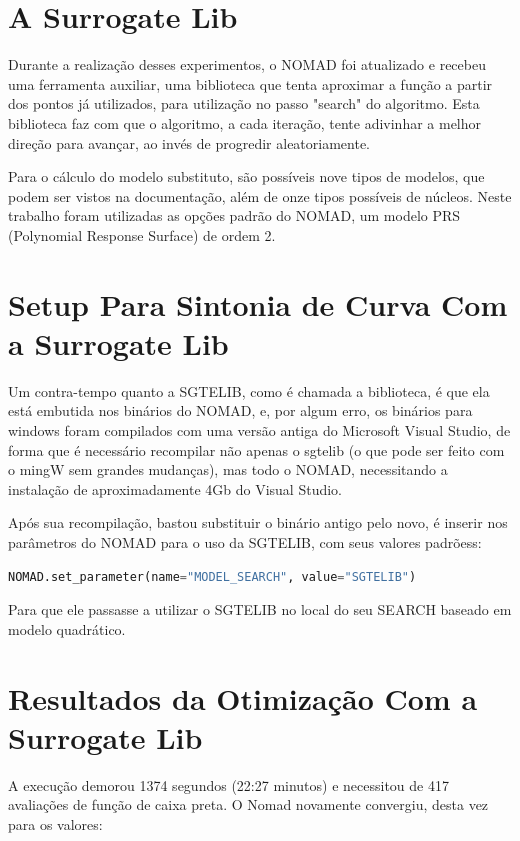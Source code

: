 \section{A Surrogate Lib}

Durante a realização desses experimentos, o NOMAD foi atualizado e recebeu uma ferramenta auxiliar, uma biblioteca que tenta aproximar a função a partir dos pontos já utilizados, para utilização no passo "search" do algoritmo. Esta biblioteca faz com que o algoritmo, a cada iteração, tente adivinhar a melhor direção para avançar, ao invés de progredir aleatoriamente.

Para o cálculo do modelo substituto, são possíveis nove tipos de modelos, que podem ser vistos na documentação, além de onze tipos possíveis de núcleos. Neste trabalho foram utilizadas as opções padrão do NOMAD, um modelo PRS (Polynomial Response Surface) de ordem 2.


\section{Setup Para Sintonia de Curva Com a Surrogate Lib}

Um contra-tempo quanto a SGTELIB, como é chamada a biblioteca, é que ela está embutida nos binários do NOMAD, e, por algum erro, os binários para windows foram compilados com uma versão antiga do Microsoft Visual Studio, de forma que é necessário recompilar não apenas o sgtelib (o que pode ser feito com o mingW sem grandes mudanças), mas todo o NOMAD, necessitando a instalação de aproximadamente 4Gb do Visual Studio.

Após sua recompilação, bastou substituir o binário antigo pelo novo, é inserir nos parâmetros do NOMAD para o uso da SGTELIB, com seus valores padrõess:
\begin{lstlisting}[language=Python]
NOMAD.set_parameter(name="MODEL_SEARCH", value="SGTELIB")
\end{lstlisting}
Para que ele passasse a utilizar o SGTELIB no local do seu SEARCH baseado em modelo quadrático.


\section{Resultados da Otimização Com a Surrogate Lib}

A execução demorou 1374 segundos (22:27 minutos) e necessitou de 417 avaliações de função de caixa preta. O Nomad novamente convergiu, desta vez para os 	valores:

